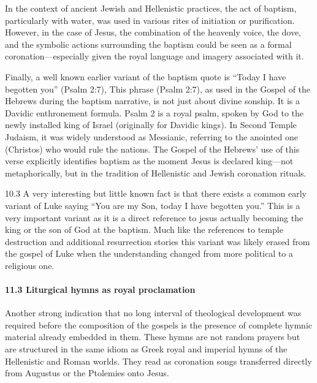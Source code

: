 In the context of ancient Jewish and Hellenistic practices, the act of baptism, particularly with water, was used in various rites of initiation or purification.
However, in the case of Jesus, the combination of the heavenly voice, the dove, and the symbolic actions surrounding the baptism could be seen as a formal coronation---especially given the royal language and imagery associated with it.

Finally, a well known earlier variant of the baptism quote is ``Today I have begotten you'' (Psalm 2:7), This phrase (Psalm 2:7), as used in the Gospel of the Hebrews during the baptism narrative, is not just about divine sonship.
It is a Davidic enthronement formula.
Psalm 2 is a royal psalm, spoken by God to the newly installed king of Israel (originally for Davidic kings).
In Second Temple Judaism, it was widely understood as Messianic, referring to the anointed one (Christos) who would rule the nations.
The Gospel of the Hebrews' use of this verse explicitly identifies baptism as the moment Jesus is declared king---not metaphorically, but in the tradition of Hellenistic and Jewish coronation rituals.

10.3 A very interesting but little known fact is that there exists a common early variant of Luke saying ``You are my Son, today I have begotten you.'' This is a very important variant as it is a direct reference to jesus actually becoming the king or the son of God at the baptism.
Much like the references to temple destruction and additional resurrection stories this variant was likely erased from the gospel of Luke when the understanding changed from more political to a religious one.

\paragraph{11.3 Liturgical hymns as royal proclamation}\label{par:liturgical-hymns-as-royal-proclamation}

Another strong indication that no long interval of theological development was required before the composition of the gospels is the presence of complete hymnic material already embedded in them.
These hymns are not random prayers but are structured in the same idiom as Greek royal and imperial hymns of the Hellenistic and Roman worlds.
They read as coronation songs transferred directly from Augustus or the Ptolemies onto Jesus.

